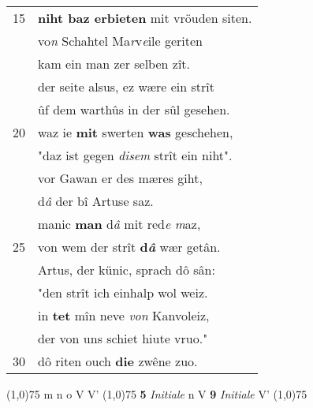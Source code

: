 \documentclass[8pt,a4paper,notitlepage]{article}
\begin{document}
\begin{table}[ht]
\begin{minipage}[t]{0.5\linewidth}
\begin{tabular}{rl}
15 & \textbf{niht baz erbieten} mit vröuden siten.\\ 
 & vo\textit{n} Schahtel Ma\textit{r}v\textit{e}ile geriten\\ 
 & kam ein man zer selben zît.\\ 
 & der seite alsus, ez wære ein strît\\ 
 & ûf dem warthûs in der sûl gesehen.\\ 
20 & waz ie \textbf{mit} swerten \textbf{was} geschehen,\\ 
 & "daz ist gegen \textit{disem} strît ein niht".\\ 
 & vor Gawan er des mæres giht,\\ 
 & d\textit{â} der bî Artuse saz.\\ 
 & manic \textbf{man} d\textit{â} mit red\textit{e} \textit{m}az,\\ 
25 & von wem der strît \textbf{d\textit{â}} wær getân.\\ 
 & Artus, der künic, sprach dô sân:\\ 
 & "den strît ich einhalp wol weiz.\\ 
 & in \textbf{tet} mîn neve \textit{von} Kanvoleiz,\\ 
 & der von uns schiet hiute vruo."\\ 
30 & dô riten ouch \textbf{die} zwêne zuo.\\ 
\end{tabular}
\scriptsize
\line(1,0){75} \newline
m n o V V' \newline
\line(1,0){75} \newline
\textbf{5} \textit{Initiale} n V  \textbf{9} \textit{Initiale} V'  \newline
\line(1,0){75} \newline

\end{minipage}
\end{table}
\end{document}
